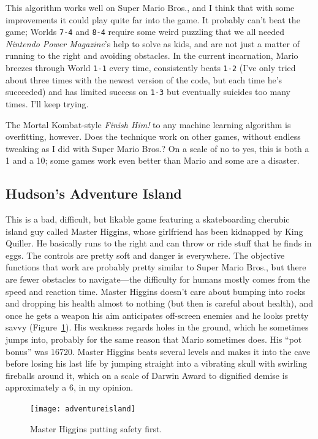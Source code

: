 \documentclass[twocolumn]{article}
\begin{document}
This algorithm works well on Super Mario Bros., and I think that with
some improvements it could play quite far into the game. It probably
can't beat the game; Worlds {\tt 7-4} and {\tt 8-4} require some weird
puzzling that we all needed {\em Nintendo Power Magazine}'s help to
solve as kids, and are not just a matter of running to the right and
avoiding obstacles. In the current incarnation, Mario breezes through
World {\tt 1-1} every time, consistently beats {\tt 1-2} (I've only
tried about three times with the newest version of the code, but each
time he's succeeded) and has limited success on {\tt 1-3} but
eventually suicides too many times. I'll keep trying.

The Mortal Kombat-style {\em Finish Him!} to any machine learning
algorithm is overfitting, however. Does the technique work on other
games, without endless tweaking as I did with Super Mario Bros.? On a
scale of no to yes, this is both a 1 and a 10; some games work even
better than Mario and some are a disaster.

\subsection{Hudson's Adventure Island}

This is a bad, difficult, but likable game featuring a skateboarding
cherubic island guy called Master Higgins, whose girlfriend has been
kidnapped by King Quiller. He basically runs to the right and can
throw or ride stuff that he finds in eggs. The controls are pretty
soft and danger is everywhere. The objective functions that work are
probably pretty similar to Super Mario Bros., but there are fewer
obstacles to navigate---the difficulty for humans mostly comes from
the speed and reaction time. Master Higgins doesn't care about bumping
into rocks and dropping his health almost to nothing (but then is
careful about health), and once he gets a weapon his aim anticipates
off-screen enemies and he looks pretty savvy
(Figure~\ref{fig:adventureisland}). His weakness regards holes in the
ground, which he sometimes jumps into, probably for the same reason
that Mario sometimes does. His ``pot bonus'' was 16720. Master Higgins
beats several levels and makes it into the cave before losing his last
life by jumping straight into a vibrating skull with swirling
fireballs around it, which on a scale of Darwin Award to dignified
demise is approximately a 6, in my opinion.

\begin{figure}[ht]
\begin{center}
\texttt{[image: adventureisland]}
\end{center}\vspace{-0.1in}
\caption{Master Higgins putting safety first.}
\label{fig:adventureisland}
\end{figure}
\end{document}

